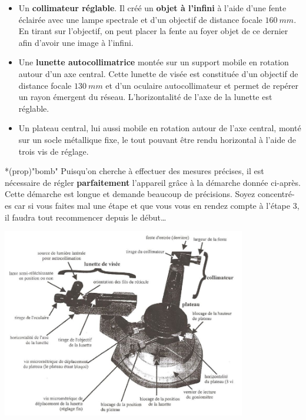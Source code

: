 \documentclass[../main/main.tex]{subfiles}
\begin{document}
\begin{itemize}
    \item Un \textbf{collimateur réglable}. Il créé un \textbf{objet à l'infini}
      à l'aide d'une fente éclairée avec une lampe spectrale et d'un objectif de
      distance focale $\SI{160}{mm}$.
      \smallbreak
      En tirant sur l'objectif, on peut placer la fente au foyer objet de ce
      dernier afin d'avoir une image à l'infini.
    \item Une \textbf{lunette autocollimatrice} montée sur un support mobile en
      rotation autour d'un axe central. Cette lunette de visée est constituée
      d'un objectif de distance focale $\SI{130}{mm}$ et d'un oculaire
      autocollimateur et permet de repérer un rayon émergent du réseau.
      L'horizontalité de l'axe de la lunette est réglable.
    \item Un plateau central, lui aussi mobile en rotation autour de l'axe
        central, monté sur un socle métallique fixe, le tout pouvant être rendu
        horizontal à l'aide de trois vis de réglage.
\end{itemize}

\begin{tcb}*(prop)"bomb"{}
  Puisqu'on cherche à effectuer des mesures précises, il est nécessaire de
  régler \textbf{parfaitement} l'appareil grâce à la démarche donnée ci-après.
  Cette démarche est longue et demande beaucoup de précisions. Soyez
  concentré-es car si vous faites mal une étape et que vous vous en rendez
  compte à l'étape 3, il faudra tout recommencer depuis le début…
\end{tcb}

\begin{center}
    \includegraphics[width=0.8\textwidth]{goniometre}
\end{center}
\end{document}
